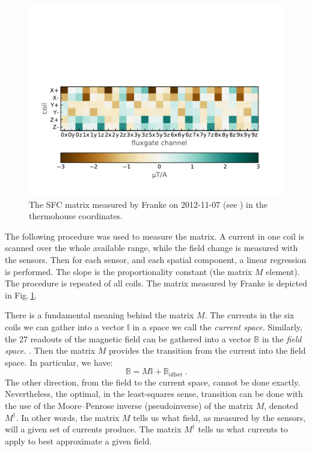 
\begin{figure}
  \centering
  \includegraphics[width=.8\linewidth]{gfx/nEDM_SFC/nEDM_SFC_matrix}
  \caption{The SFC matrix measured by Franke on 2012-11-07 (see \cite{Franke2013}) in the thermohouse coordinates.}
  \label{fig:nEDM_SFC_matrix}
\end{figure}

The following procedure was used to measure the matrix. A current in one coil is scanned over the whole available range, while the field change is measured with the sensors. Then for each sensor, and each spatial component, a linear regression is performed. The slope is the proportionality constant (the matrix $M$ element). The procedure is repeated of all coils. The matrix measured by Franke is depicted in Fig.\,\ref{fig:nEDM_SFC_matrix}.

There is a fundamental meaning behind the matrix $M$. The currents in the six coils we can gather into a vector $\mathbb{I}$ in a space we call the \emph{current space}. Similarly, the 27 readouts of the magnetic field can be gathered into a vector $\mathbb{B}$ in the \emph{field space}. . Then the matrix $M$ provides the transition from the current into the field space. In particular, we have:
\begin{equation}
  \mathbb{B} = M \mathbb{I} + \mathbb{B}_\text{offset} \ .
\end{equation}
The other direction, from the field to the current space, cannot be done exactly. Nevertheless, the optimal, in the least-squares sense, transition can be done with the use of the Moore--Penrose inverse (pseudoinverse)  of the matrix $M$, denoted $M^\dagger$.
In other words, the matrix $M$ tells us what field, as measured by the sensors, will a given set of currents produce. The matrix $M^\dagger$ tells us what currents to apply to best approximate a given field.

